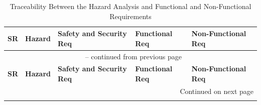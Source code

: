 \documentclass[10pt]{article}
\begin{document}
\begin{longtable}{p{} p{} >{\raggedright\arraybackslash}p{} >{\raggedright\arraybackslash}p{} >{\raggedright\arraybackslash}p{}}

\caption{Traceability Between the Hazard Analysis and Functional and Non-Functional Requirements}
\label{tab:HA2FRtm}\\
\toprule
\textbf{SR} & \textbf{Hazard} & \textbf{Safety and Security Req} & \textbf{Functional Req} & \textbf{Non-Functional Req} \\
\midrule
\endfirsthead

\multicolumn{5}{c}{\tablename\ \thetable{} -- continued from previous page} \\
\toprule
\textbf{SR} & \textbf{Hazard} & \textbf{Safety and Security Req} & \textbf{Functional Req} & \textbf{Non-Functional Req} \\
\midrule
\endhead

\midrule
\multicolumn{5}{r}{Continued on next page} \\
\endfoot

\bottomrule
\endlastfoot


\end{longtable}
\end{document}
